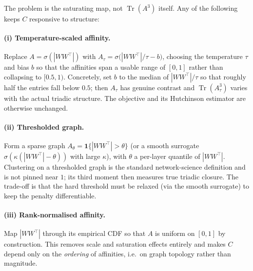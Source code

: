 \documentclass[11pt,a4paper]{article}
\begin{document}
The problem is the saturating map, not $\operatorname{Tr}(A^3)$ itself. Any
of the following keeps $C$ responsive to structure:

\paragraph{(i) Temperature-scaled affinity.} Replace
$A=\sigma(|WW^\top|)$ with $A_\tau=\sigma\!\big(|WW^\top|/\tau - b\big)$,
choosing the temperature $\tau$ and bias $b$ so that the affinities span a
usable range of $[0,1]$ rather than collapsing to $[0.5,1)$. Concretely,
set $b$ to the median of $|WW^\top|/\tau$ so that roughly half the entries
fall below $0.5$; then $A_\tau$ has genuine contrast and
$\operatorname{Tr}(A_\tau^3)$ varies with the actual triadic structure. The
objective and its Hutchinson estimator are otherwise unchanged.

\paragraph{(ii) Thresholded graph.} Form a sparse graph
$A_\theta = \mathbf{1}\{|WW^\top| > \theta\}$ (or a smooth surrogate
$\sigma(\kappa(|WW^\top|-\theta))$ with large $\kappa$), with $\theta$ a
per-layer quantile of $|WW^\top|$. Clustering on a thresholded graph is the
standard network-science definition and is not pinned near $1$; its third
moment then measures true triadic closure. The trade-off is that the hard
threshold must be relaxed (via the smooth surrogate) to keep the penalty
differentiable.

\paragraph{(iii) Rank-normalised affinity.} Map $|WW^\top|$ through its
empirical CDF so that $A$ is uniform on $[0,1]$ by construction. This
removes scale and saturation effects entirely and makes $C$ depend only on
the \emph{ordering} of affinities, i.e.\ on graph topology rather than
magnitude.
\end{document}
